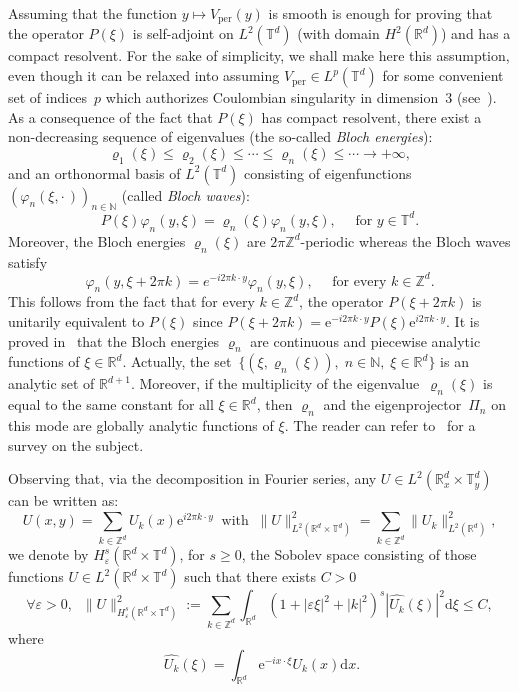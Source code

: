 \documentclass[AHL,Unicode,longabstracts]{cedram}
\DeclareMathOperator{\per}{per}
\newcommand*\R{{\mathbb R}}
\newcommand*\N{{\mathbb N}}
\newcommand*\Z{{\mathbb Z}}
\newcommand*\T{{\mathbb T}}
\newcommand*\eps{\varepsilon}
\numberwithin{equation}{section}
\newcommand{\ee}{{\mathrm e}}
\let\oldforall\forall
\renewcommand*{\forall}{\mathrel{\oldforall}}
\newcommand*{\dd}{\mathrm{d}}
\newcommand*{\dx}{\dd x}
\newcommand*{\dxi}{\dd \xi}
\begin{document}
Assuming that the function $y\mapsto V_{\per}(y)$ is smooth is enough for proving that the operator $P(\xi)$ is self-adjoint on $L^2(\T^d)$ (with domain $H^2(\R^d)$) and has a compact resolvent. For the sake of simplicity, we shall make here this assumption, even though it can be relaxed into assuming $V_{\per}\in L^p (\T^d)$ for some convenient set of indices~$p$ which authorizes Coulombian singularity in dimension~$3$ (see~\cite{lewin_lecture}). As a consequence of the fact that $P(\xi)$ has compact resolvent, there exist a non-decreasing sequence of eigenvalues (the so-called \emph{Bloch energies}):
\[
\varrho_1(\xi)\leq \varrho_2(\xi)\leq \cdots\leq \varrho_n(\xi) \leq \cdots \longrightarrow +\infty,
\]
and an orthonormal basis of $L^2(\T^d)$ consisting of eigenfunctions $\left(\varphi_n(\xi,\cdot\,)\right)_{n\in\N}$ (called \emph{Bloch waves}):
\[
P(\xi)\varphi_n(y,\xi)=\varrho_n(\xi)\varphi_n(y,\xi),\quad \text{ for }y\in\T^d.
\]
Moreover, the Bloch energies $\varrho_n(\xi)$ are $2\pi\Z^d$-periodic whereas the Bloch waves satisfy
\[
\varphi_n(y,\xi+2\pi k)=e^{-i2\pi k\cdot y}\varphi_n(y,\xi),\quad \text{ for every } k\in\Z^d.
\]
This follows from the fact that for every $k\in\Z^d$, the operator $P(\xi+2\pi k)$ is unitarily equivalent to $P(\xi)$ since $P(\xi + 2\pi k) = {\ee}^{-i2\pi k\cdot y}P(\xi){\ee}^{i2\pi k\cdot y}$. It is proved in~\cite{Wilcox78} that the Bloch energies $\varrho_n$ are continuous and piecewise analytic functions of $\xi\in\R^d$. Actually, the set~$\{(\xi,\varrho_n(\xi)),\;n\in\N,\;\xi\in\R^d \}$ is an analytic set of $\R^{d+1}$. Moreover, if the multiplicity of the eigenvalue~$\varrho_n(\xi)$ is equal to the same constant for all $\xi\in\R^d$, then $\varrho_n$ and the eigenprojector~$\Pi_n$ on this mode are globally analytic functions of $\xi$. The reader can refer to~\cite{Kuch16} for a survey on the subject.


Observing that, via the decomposition in Fourier series, any $U\in L^2(\R^d_x\times\T^d_y)$ can be written as:
\[
U(x,y)=\sum_{k\in\Z^d}U_k(x){\ee}^{i2\pi k\cdot y}\;\;\text{with}\;\;
\|U\|_{L^2(\R^d\times\T^d)}^2=\sum_{k\in\Z^d}\|U_k\|_{L^2(\R^d)}^2,
\]
we denote by $H^s_\eps(\R^d\times\T^d)$, for $s\geq 0$, the Sobolev space consisting of those functions $U \in L^2(\R^d\times\T^d)$ such that there exists $C>0$
\begin{equation}\label{def:Hseps}
\forall \eps>0,\;\;\|U\|_{H^s_\eps(\R^d\times\T^d)}^2:=\sum_{k\in\Z^d}\int_{\R^d}(1+|\eps\xi|^2+|k|^2)^s|\widehat{U_k}(\xi)|^2\dxi\leq C,
\end{equation}
where 
\[
\;\widehat{U_k}(\xi)= \int_{\R^d} {\ee}^{-ix\cdot \xi} U_k(x) \dx.
\]
\end{document}

